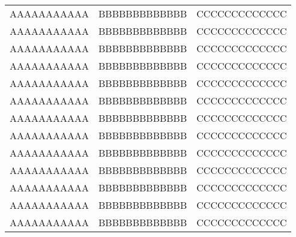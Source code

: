 \begin{longtable}{ccc}
  AAAAAAAAAAA & BBBBBBBBBBBBB & CCCCCCCCCCCCC \\
  AAAAAAAAAAA & BBBBBBBBBBBBB & CCCCCCCCCCCCC \\
  AAAAAAAAAAA & BBBBBBBBBBBBB & CCCCCCCCCCCCC \\
  AAAAAAAAAAA & BBBBBBBBBBBBB & CCCCCCCCCCCCC \\
  AAAAAAAAAAA & BBBBBBBBBBBBB & CCCCCCCCCCCCC \\
  AAAAAAAAAAA & BBBBBBBBBBBBB & CCCCCCCCCCCCC \\
  AAAAAAAAAAA & BBBBBBBBBBBBB & CCCCCCCCCCCCC \\
  AAAAAAAAAAA & BBBBBBBBBBBBB & CCCCCCCCCCCCC \\
  AAAAAAAAAAA & BBBBBBBBBBBBB & CCCCCCCCCCCCC \\
  AAAAAAAAAAA & BBBBBBBBBBBBB & CCCCCCCCCCCCC \\
  AAAAAAAAAAA & BBBBBBBBBBBBB & CCCCCCCCCCCCC \\
  AAAAAAAAAAA & BBBBBBBBBBBBB & CCCCCCCCCCCCC \\
  AAAAAAAAAAA & BBBBBBBBBBBBB & CCCCCCCCCCCCC \\
  
\end{longtable}
